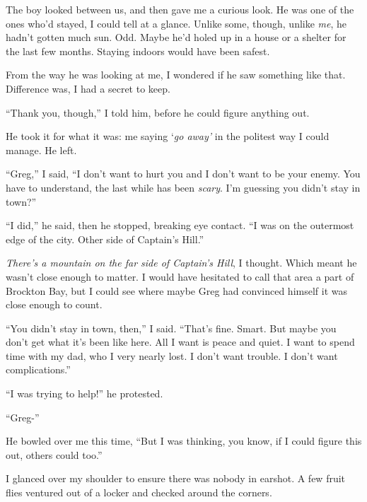 The boy looked between us, and then gave me a curious look.  He was one of the ones who'd stayed, I could tell at a glance.  Unlike some, though, unlike \emph{me}, he hadn't gotten much sun.  Odd.  Maybe he'd holed up in a house or a shelter for the last few months.  Staying indoors would have been safest.



From the way he was looking at me, I wondered if he saw something like that.  Difference was, I had a secret to keep.



``Thank you, though,'' I told him, before he could figure anything out.



He took it for what it was: me saying `\emph{go away' }in the politest way I could manage.  He left.



``Greg,'' I said, ``I don't want to hurt you and I don't want to be your enemy.  You have to understand, the last while has been \emph{scary}.  I'm guessing you didn't stay in town?''



``I did,'' he said, then he stopped, breaking eye contact.  ``I was on the outermost edge of the city.  Other side of Captain's Hill.''



\emph{There's a mountain on the far side of Captain's Hill}, I thought.  Which meant he wasn't close enough to matter.  I would have hesitated to call that area a part of Brockton Bay, but I could see where maybe Greg had convinced himself it was close enough to count.



``You didn't stay in town, then,'' I said.  ``That's fine.  Smart.  But maybe you don't get what it's been like here.  All I want is peace and quiet.  I want to spend time with my dad, who I very nearly lost.  I don't want trouble.  I don't want complications.''



``I was trying to help!'' he protested.



``Greg-''



He bowled over me this time, ``But I was thinking, you know, if I could figure this out, others could too.''



I glanced over my shoulder to ensure there was nobody in earshot.  A few fruit flies ventured out of a locker and checked around the corners.



